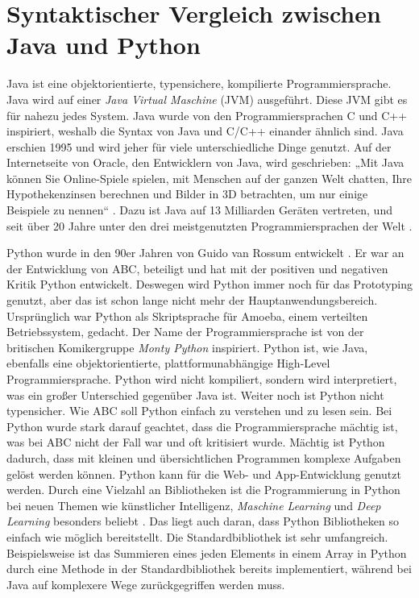 \newcommand{\code}[1]{\texttt{#1}}

\chapter{Syntaktischer Vergleich zwischen Java und Python}
Java ist eine objektorientierte, typensichere, kompilierte Programmiersprache. 
Java wird auf einer \textit{Java Virtual Maschine} (JVM) ausgeführt. 
Diese JVM gibt es für nahezu jedes System. 
Java wurde von den Programmiersprachen C und C++ inspiriert, weshalb die Syntax von Java und C/C++ einander ähnlich sind. 
Java erschien 1995 und wird jeher für viele unterschiedliche Dinge genutzt. 
Auf der Internetseite von Oracle, den Entwicklern von Java, wird geschrieben: „Mit Java können Sie Online-Spiele spielen, mit Menschen auf der ganzen Welt chatten, Ihre Hypothekenzinsen berechnen und Bilder in 3D betrachten, um nur einige Beispiele zu nennen“ \cite{Oracle:Java}. 
Dazu ist Java auf 13 Milliarden Geräten vertreten, und seit über 20 Jahre unter den drei meistgenutzten Programmiersprachen der Welt \cite{Github:PYPL}\cite{Oracle:Twitter}.
\par
Python wurde in den 90er Jahren von Guido van Rossum entwickelt \cite{Python3:Buch}. 
Er war an der Entwicklung von ABC, beteiligt und hat mit der positiven und negativen Kritik Python entwickelt. 
Deswegen wird Python immer noch für das Prototyping genutzt, aber das ist schon lange nicht mehr der Hauptanwendungsbereich. 
Ursprünglich war Python als Skriptsprache für Amoeba, einem verteilten Betriebssystem, gedacht. 
Der Name der Programmiersprache ist von der britischen Komikergruppe \textit{Monty Python} inspiriert. 
Python ist, wie Java, ebenfalls eine objektorientierte, plattformunabhängige High-Level Programmiersprache. 
Python wird nicht kompiliert, sondern wird interpretiert, was ein großer Unterschied gegenüber Java ist. 
Weiter noch ist Python nicht typensicher. 
Wie ABC soll Python einfach zu verstehen und zu lesen sein. 
Bei Python wurde stark darauf geachtet, dass die Programmiersprache mächtig ist, was bei ABC nicht der Fall war und oft kritisiert wurde. 
Mächtig ist Python dadurch, dass mit kleinen und übersichtlichen Programmen komplexe Aufgaben gelöst werden können. 
Python kann für die Web- und App-Entwicklung genutzt werden. 
Durch eine Vielzahl an Bibliotheken ist die Programmierung in Python bei neuen Themen wie künstlicher Intelligenz, \textit{Maschine Learning} und \textit{Deep Learning} besonders beliebt \cite{PythonCS}. 
Das liegt auch daran, dass Python Bibliotheken so einfach wie möglich bereitstellt. 
Die Standardbibliothek ist sehr umfangreich. 
Beispielsweise ist das Summieren eines jeden Elements in einem Array in Python durch eine Methode in der Standardbibliothek bereits implementiert, während bei Java auf komplexere Wege zurückgegriffen werden muss.

